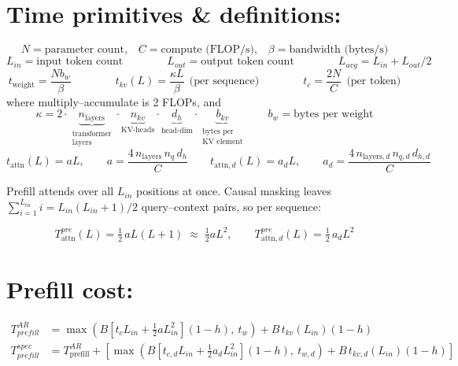 \documentclass[11pt]{article}
\begin{document}
\section*{Time primitives \& definitions:}

\begin{equation*}
N = \text{parameter count,}
\quad
C = \text{compute (FLOP/s),}
\quad
\beta = \text{bandwidth (bytes/s)}
\end{equation*}
\begin{equation*}
L_{in} = \text{input token count}
\qquad\qquad
L_{out} = \text{output token count}
\qquad\qquad
L_{avg} = L_{in} + L_{out}/2
\end{equation*}
\begin{equation*}
t_{\mathrm{weight}} = \frac{N b_w}{\beta}
\qquad\qquad
t_{kv}(L) = \frac{\kappa L}{\beta} \ \ \text{(per sequence)}
\qquad\qquad
t_{c} = \frac{2N}{C} \ \ \text{(per token)}
\end{equation*}
where multiply--accumulate is 2 FLOPs, and
\begin{equation*}
\kappa = 2 \cdot
\underbrace{n_{\mathrm{layers}}}_{\substack{\text{transformer}\\\text{layers}}} \cdot
\underbrace{n_{kv}}_{\text{KV-heads}} \cdot
\underbrace{d_h}_{\text{head-dim}} \cdot
\underbrace{b_{kv}}_{\substack{\text{bytes per}\\\text{KV element}}}
\qquad
b_w = \text{bytes per weight}
\end{equation*}
\begin{equation*}
t_{\mathrm{attn}}(L) = a L, \qquad a = \frac{4\, n_{\mathrm{layers}}\, n_q\, d_h}{C}
\qquad
t_{\mathrm{attn},d}(L) = a_d L, \qquad a_d = \frac{4\, n_{\mathrm{layers},d}\, n_{q,d}\, d_{h,d}}{C}
\end{equation*}

Prefill attends over all $L_{in}$ positions at once.  Causal masking leaves
$\sum_{i=1}^{L_{in}} i = L_{in}(L_{in}+1)/2$ query--context pairs, so per
sequence:

\begin{equation*}
T_{\mathrm{attn}}^{pre}(L) = \tfrac{1}{2}\, a L (L+1) \;\approx\; \tfrac{1}{2} a L^2,
\qquad
T_{\mathrm{attn},d}^{pre}(L) = \tfrac{1}{2}\, a_d L^2
\end{equation*}

\section*{Prefill cost:}

\begin{align*}
T_{prefill}^{AR} &= \max\left(B \left[t_c L_{in} + \tfrac{1}{2} a L_{in}^2\right](1-h),\ t_w \right) + B\, t_{kv}(L_{in})(1-h) \tag{$h =$ prefix cache hit rate}\\
T_{prefill}^{spec} &= T_{\mathrm{prefill}}^{AR} + \left[\max\left(B \left[t_{c,d} L_{in} + \tfrac{1}{2} a_d L_{in}^2\right](1-h),\ t_{w,d} \right) + B\, t_{kv,d}(L_{in})(1-h)\right] \tag{$d =$ drafter}
\end{align*}
\end{document}
